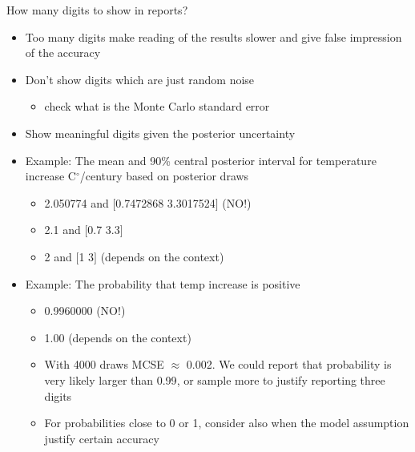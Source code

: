 \documentclass[english,t]{beamer}
\begin{document}
\begin{frame}{How many digits to show in reports?}

\vspace{-0.5\baselineskip}  
  \begin{itemize}
  \item Too many digits make reading of the results slower and give
    false impression of the accuracy
  \item<2-> Don't show digits which are just random noise
    \begin{itemize}
    \item check what is the Monte Carlo standard error
    \end{itemize}
  \item<3-> Show meaningful digits given the posterior uncertainty
  \item<4-> Example: The mean and 90\% central posterior interval for temperature
     increase C$^\circ$/century based on posterior draws
     \begin{itemize}
     \item<5-> {\color{red} 2.050774 and $[$0.7472868 3.3017524$]$} (NO!)
     \item<6-> {\color{darkgreen} 2.1 and $[$0.7 3.3$]$}
    \item<7-> {\color{navyblue} 2 and $[$1 3$]$} (depends on the context)
     \end{itemize}
   \item<8-> Example: The probability that temp increase is
     positive
     \begin{itemize}
     \item<9-> {\color{red} 0.9960000} (NO!)
     \item<10-> {\color{navyblue} 1.00} (depends on the context)
     \item<11-> With 4000 draws MCSE $\approx$ 0.002. We could report
       that probability is {\color{darkgreen} very likely larger than 0.99}, or sample
       more to justify reporting three digits
     \item<12-> For probabilities close to 0 or 1, consider also when
       the model assumption justify certain accuracy
     \end{itemize}
  \end{itemize}

  
\end{frame}
\end{document}
